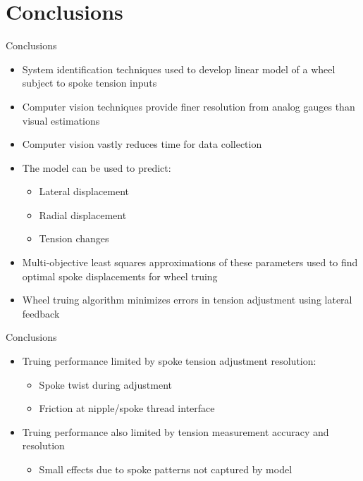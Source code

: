\documentclass[mathserif]{beamer}
\begin{document}
\section{Conclusions}

\begin{frame}{Conclusions}
\begin{itemize}
    \item System identification techniques used to develop linear model of a wheel subject to spoke tension inputs
    \item Computer vision techniques provide finer resolution from analog gauges than visual estimations
    \item Computer vision vastly reduces time for data collection
    \item The model can be used to predict:
    \begin{itemize}
        \item{Lateral displacement}
        \item{Radial displacement}
        \item{Tension changes}
    \end{itemize}
    \item Multi-objective least squares approximations of these parameters used to find optimal spoke displacements for wheel truing
    \item Wheel truing algorithm minimizes errors in tension adjustment using lateral feedback

\end{itemize}
\end{frame}

\begin{frame}{Conclusions}
\begin{itemize}
    \item Truing performance limited by spoke tension adjustment resolution: 
    \begin{itemize}
        \item{Spoke twist during adjustment}
        \item{Friction at nipple/spoke thread interface}
    \end{itemize}
    \item Truing performance also limited by tension measurement accuracy and resolution
    \begin{itemize}
        \item Small effects due to spoke patterns not captured by model
    \end{itemize}
\end{itemize}
\end{frame}
\end{document}
